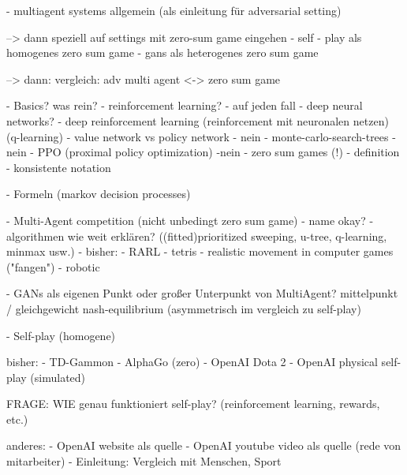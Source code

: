 - multiagent systems allgemein (als einleitung für adversarial setting)

--> dann speziell auf settings mit zero-sum game eingehen
- self - play als homogenes zero sum game
- gans als heterogenes zero sum game

--> dann: vergleich: adv multi agent <-> zero sum game 


- Basics?
was rein?
	- reinforcement learning? - auf jeden fall
    - deep neural networks? - deep reinforcement learning (reinforcement mit neuronalen netzen) (q-learning)
    - value network vs policy network - nein
    - monte-carlo-search-trees - nein
    - PPO (proximal policy optimization) -nein
    - zero sum games (!) - definition - konsistente notation 
    
    - Formeln (markov decision processes)
    

- Multi-Agent competition (nicht unbedingt zero sum game)
	- name okay?
    - algorithmen wie weit erklären? ((fitted)prioritized sweeping, u-tree, q-learning, minmax usw.)
    - bisher:
    	- RARL
        - tetris
        - realistic movement in computer games ("fangen")
        - robotic

- GANs als eigenen Punkt oder großer Unterpunkt von MultiAgent? mittelpunkt / gleichgewicht nash-equilibrium (asymmetrisch im vergleich zu self-play)

- Self-play (homogene)

bisher:
	- TD-Gammon
    - AlphaGo (zero)
    - OpenAI Dota 2
    - OpenAI physical self-play (simulated)
    
    FRAGE: WIE genau funktioniert self-play? (reinforcement learning, rewards, etc.)
    
anderes:
	- OpenAI website als quelle
    - OpenAI youtube video als quelle (rede von mitarbeiter)
    - Einleitung: Vergleich mit Menschen, Sport